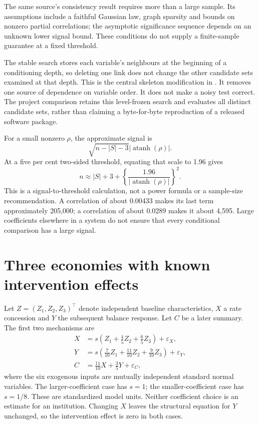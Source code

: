 The same source's consistency result requires more than a large sample. Its
assumptions include a faithful Gaussian law, graph sparsity and bounds on
nonzero partial correlations; the asymptotic significance sequence depends on
an unknown lower signal bound. These conditions do not supply a finite-sample
guarantee at a fixed threshold. \citep[Assumptions A1--A4 and Theorem 1,
pp.~619--620]{kalisch2007}

The stable search stores each variable's neighbours at the beginning of a
conditioning depth, so deleting one link does not change the other candidate
sets examined at that depth. This is the central skeleton modification in
\citet[Section 4.1, Algorithm 4.1 and Theorem 3]{exec13_latentr_colombo2014}. It removes
one source of dependence on variable order. It does not make a noisy test
correct. The project comparison retains this level-frozen search and evaluates
all distinct candidate sets, rather than claiming a byte-for-byte reproduction
of a released software package.

For a small nonzero $\rho$, the approximate signal is
\[
 \sqrt{n-|S|-3}|\operatorname{atanh}(\rho)|.
\]
At a five per cent two-sided threshold, equating that scale to 1.96 gives
\begin{equation}
 n\approx |S|+3+
 \left\{\frac{1.96}{|\operatorname{atanh}(\rho)|}\right\}^{2}.
 \label{closure30:signal-scale}
\end{equation}
This is a signal-to-threshold calculation, not a power formula or a sample-size
recommendation. A correlation of about 0.00433 makes its last term approximately
205,000; a correlation of about 0.0289 makes it about 4,595. Large coefficients
elsewhere in a system do not ensure that every conditional comparison has a
large signal.

\section{Three economies with known intervention effects}

Let $Z=(Z_1,Z_2,Z_3)^\top$ denote independent baseline characteristics,
$X$ a rate concession and $Y$ the subsequent balance response. Let $C$ be a
later summary. The first two mechanisms are
\begin{align}
 X&=s\left(Z_1+\frac45Z_2+\frac65Z_3\right)+\varepsilon_X,\\
 Y&=s\left(\frac7{10}Z_1+\frac{11}{10}Z_2+
                 \frac9{10}Z_3\right)+\varepsilon_Y,\\
 C&=\frac{11}{10}X+\frac35Y+\varepsilon_C,
 \label{closure30:sampling-economy}
\end{align}
where the six exogenous inputs are mutually independent standard normal
variables. The larger-coefficient case has $s=1$; the smaller-coefficient case
has $s=1/8$. These are standardized model units. Neither coefficient choice is
an estimate for an institution. Changing $X$ leaves the structural equation
for $Y$ unchanged, so the intervention effect is zero in both cases.

